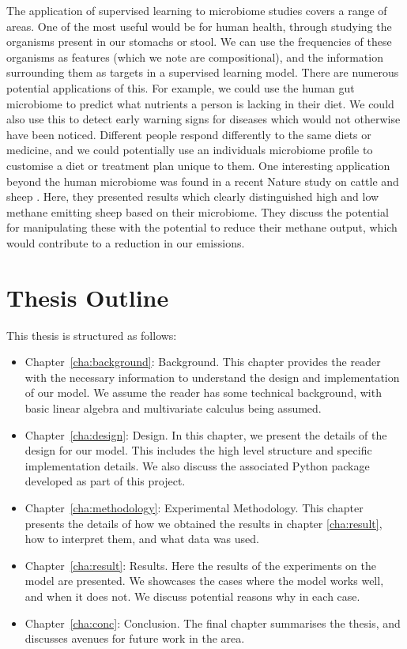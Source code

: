 The application of supervised learning to microbiome studies covers a range of areas.
 One of the most useful would be for human health, through studying the organisms present in our stomachs or stool. We can use the frequencies of these organisms as features (which we note are compositional), and the information surrounding them as targets in a supervised learning model. There are numerous potential applications of this. For example, we could use the human gut microbiome to predict what nutrients a person is lacking in their diet. We could also use this to detect early warning signs for diseases which would not otherwise have been noticed. Different people respond differently to the same diets or medicine, and we could potentially use an individuals microbiome profile to customise a diet or treatment plan unique to them. One interesting application beyond the human microbiome was found in a recent Nature study on cattle and sheep \citep{Stewart2019}. Here, they presented results which clearly distinguished high and low methane emitting sheep based on their microbiome. They discuss the potential for manipulating these with the potential to reduce their methane output, which would contribute to a reduction in our emissions. 

\section{Thesis Outline}
\label{sec:outline}
This thesis is structured as follows:

\begin{itemize}
    \item Chapter~\ref{cha:background}: Background. This chapter provides the reader with the necessary information to understand the design and implementation of our model. We assume the reader has some technical background, with basic linear algebra and multivariate calculus being assumed. 
    \item Chapter~\ref{cha:design}: Design. In this chapter, we present the details of the design for our model. This includes the high level structure and specific implementation details. We also discuss the associated Python package developed as part of this project. 
    \item Chapter~\ref{cha:methodology}: Experimental Methodology. This chapter presents the details of how we obtained the results in chapter \ref{cha:result}, how to interpret them, and what data was used.  
    \item Chapter~\ref{cha:result}: Results. Here the results of the experiments on the model are presented. We showcases the cases where the model works well, and when it does not. We discuss potential reasons why in each case.
    \item Chapter~\ref{cha:conc}: Conclusion. The final chapter summarises the thesis, and discusses avenues for future work in the area. 
\end{itemize}





